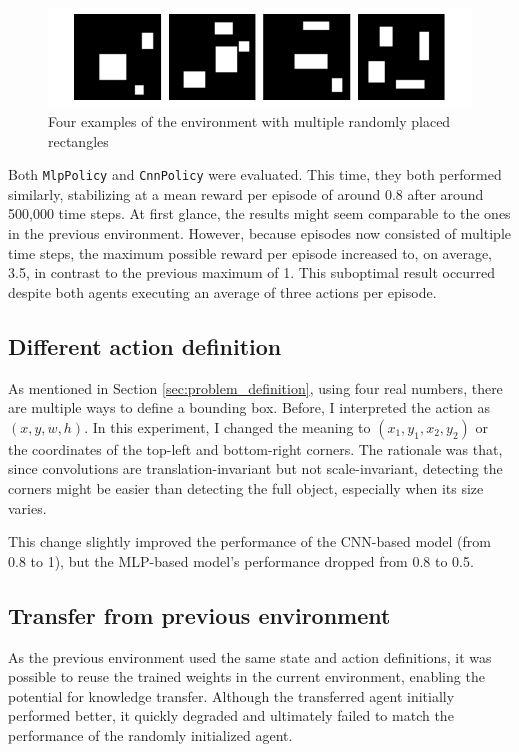 \documentclass[
  digital,     %
  oneside,     %
  nosansbold,  %
  nocolorbold, %
  lof,         %
  lot,         %
]{fithesis4}
\begin{document}
\begin{figure}
    \includegraphics[width=1\linewidth]{env_examples/env3.pdf}
    \caption{Four examples of the environment with multiple randomly placed rectangles}
    \label{fig:env3}
\end{figure}

Both \texttt{MlpPolicy} and \texttt{CnnPolicy} were evaluated. This time, they both performed similarly, stabilizing at a mean reward per episode of around 0.8 after around 500,000 time steps. At first glance, the results might seem comparable to the ones in the previous environment. However, because episodes now consisted of multiple time steps, the maximum possible reward per episode increased to, on average, 3.5, in contrast to the previous maximum of 1. This suboptimal result occurred despite both agents executing an average of three actions per episode.

\subsection{Different action definition}
\label{subsec:different_rect_repr}

As mentioned in Section \ref{sec:problem_definition}, using four real numbers, there are multiple ways to define a bounding box. Before, I interpreted the action as $(x, y, w, h)$. In this experiment, I changed the meaning to $(x_1, y_1, x_2, y_2)$ or the coordinates of the top-left and bottom-right corners. The rationale was that, since convolutions are translation-invariant but not scale-invariant, detecting the corners might be easier than detecting the full object, especially when its size varies.

This change slightly improved the performance of the CNN-based model (from 0.8 to 1), but the MLP-based model's performance dropped from 0.8 to 0.5.

\subsection{Transfer from previous environment}

As the previous environment used the same state and action definitions, it was possible to reuse the trained weights in the current environment, enabling the potential for knowledge transfer. Although the transferred agent initially performed better, it quickly degraded and ultimately failed to match the performance of the randomly initialized agent.
\end{document}
